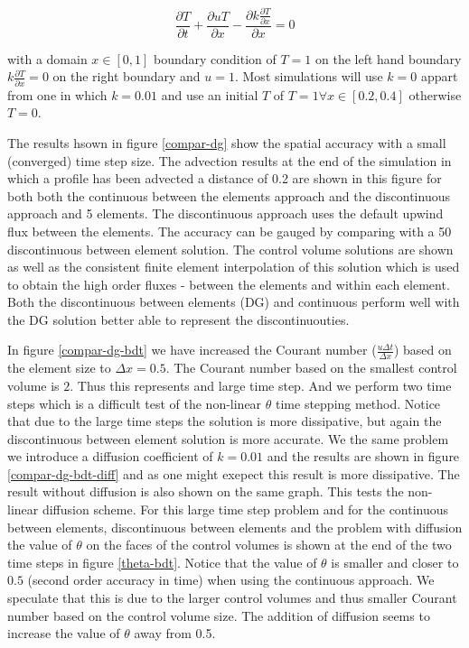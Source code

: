 \begin{equation} 
\frac{\partial T}{\partial t} + \frac{\partial u T}{\partial x} 
- \frac{\partial k \frac{\partial T }{\partial x}}{\partial x} =0
\end{equation}

with a domain $x\in \left[0,1\right]$ boundary condition of $T=1$ on the left hand boundary 
$k\frac{\partial T }{\partial x}=0$ on the right boundary and $u=1$. 
Most simulations will use $k=0$ appart from one in which $k=0.01$ 
and use an initial $T$ of $T=1 \forall x\in \left[ 0.2, 0.4 \right]$ 
otherwise $T=0$.  

The results hsown in figure \ref{compar-dg} show the spatial accuracy 
with a small (converged) time step size. The advection results at 
the end of the simulation in which a profile has been advected a distance 
of 0.2 are shown in this figure for both both the continuous between 
the elements approach and the discontinuous approach and 5 elements. 
The discontinuous approach uses the default upwind flux between 
the elements. The accuracy can be gauged by comparing with a 50 
discontinuous between element solution. 
The control volume solutions are shown as well as the consistent finite 
element interpolation of this solution which is used to obtain the 
high order fluxes - between the elements and within each element. 
Both the discontinuous between elements (DG) and continuous 
perform well with the DG solution better able to represent 
the discontinuouties. 

In figure \ref{compar-dg-bdt} we have increased the Courant number ($\frac{u \Delta t}{\Delta x}$)  based on the 
element size to ${\Delta x}=0.5$. The Courant number based on the smallest 
control volume is $2$. Thus this represents and large time step. 
And we perform two time steps which is a difficult test 
of the non-linear $\theta$ time stepping method. 
Notice that due to the large time 
steps the solution is more dissipative, but again the 
discontinuous between element solution is more accurate. 
We the same problem we introduce a diffusion coefficient 
of $k=0.01$ and the results are shown in figure 
\ref{compar-dg-bdt-diff} and 
as one might exepect this result is more dissipative. 
The result without diffusion is also shown on the same graph. 
This tests the non-linear diffusion scheme. 
For this large time step problem and for the continuous between 
elements, discontinuous between elements and the problem with diffusion 
the value of $\theta$ on the faces of the control volumes is shown 
at the end of the two time steps in figure \ref{theta-bdt}. 
Notice that the value of $\theta$ is smaller and closer to $0.5$ 
(second order accuracy in time) when using the continuous approach. 
We speculate that this is due to the larger control volumes and 
thus smaller Courant number based on the control volume size. 
The addition of diffusion seems to increase the value of $\theta$ 
away from 0.5. 

